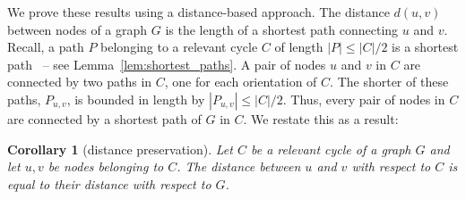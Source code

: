 \documentclass[fleqn,11pt]{article}
\newtheorem{corollary}[theorem]{Corollary}
\newcommand\calM{\mathcal{M}}
\begin{document}



We prove these results using a distance-based approach. 
The distance $d(u,v)$ between nodes of a graph $G$ is the length of a shortest path connecting $u$ and $v$.
Recall, a path $P$ belonging to a relevant cycle $C$ of length $|P|\le |C|/2$ is a shortest path~\cite{vismaraUnion1997} -- see Lemma~\ref{lem:shortest_paths}. 
A pair of nodes $u$ and $v$ in $C$ are connected by two paths in $C$, one for each orientation of $C$. 
The shorter of these paths, $P_{u,v}$, is bounded in length by $|P_{u,v}|\le |C|/2$. 
Thus, every pair of nodes in $C$ are connected by a shortest path of $G$ in $C$. We restate this as a result:

\begin{corollary}[distance preservation]
	Let $C$ be a relevant cycle of a graph $G$ and let $u,v$ be nodes belonging to $C$. The distance between $u$ and $v$ with respect to $C$ is equal to their distance with respect to $G$.
	\label{Cor:dist_pres}
\end{corollary}
\end{document}
